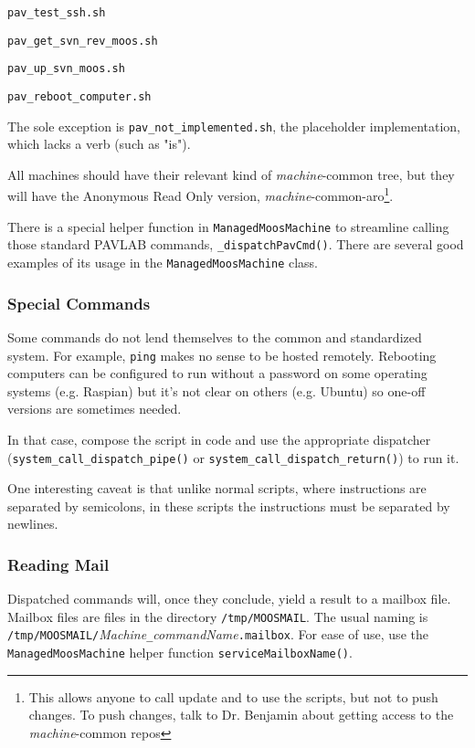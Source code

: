 \documentclass[11pt]{article}
\begin{document}
\begin{description}
\item \texttt{pav\_test\_ssh.sh}
\item \texttt{pav\_get\_svn\_rev\_moos.sh}
\item \texttt{pav\_up\_svn\_moos.sh}
\item \texttt{pav\_reboot\_computer.sh}
\end{description}

The sole exception is \texttt{pav\_not\_implemented.sh}, the placeholder implementation, which lacks a verb (such as "is").

All machines should have their relevant kind of \textit{machine}-common tree, but they will have the Anonymous Read Only version, \textit{machine}-common-aro\footnote{This allows anyone to call update and to use the scripts, but not to push changes. To push changes, talk to Dr. Benjamin about getting access to the \textit{machine}-common repos}.

There is a special helper function in \texttt{ManagedMoosMachine} to streamline calling those standard PAVLAB commands, \texttt{\_dispatchPavCmd()}. There are several good examples of its usage in the \texttt{ManagedMoosMachine} class.

\subsubsection{Special Commands}

Some commands do not lend themselves to the common and standardized system. For example, \texttt{ping} makes no sense to be hosted remotely. Rebooting computers can be configured to run without a password on some operating systems (e.g. Raspian) but it's not clear on others (e.g. Ubuntu) so one-off versions are sometimes needed.

In that case, compose the script in code and use the appropriate dispatcher (\texttt{system\_call\_dispatch\_pipe()} or \texttt{system\_call\_dispatch\_return()}) to run it. 

One interesting caveat is that unlike normal scripts, where instructions are separated by semicolons, in these scripts the instructions must be separated by newlines.

\subsubsection{Reading Mail}

Dispatched commands will, once they conclude, yield a result to a mailbox file. Mailbox files are files in the directory \texttt{/tmp/MOOSMAIL}. The usual naming is \texttt{/tmp/MOOSMAIL/}\textit{Machine}\texttt{\_}\textit{commandName}\texttt{.mailbox}. For ease of use, use the \texttt{ManagedMoosMachine} helper function \texttt{serviceMailboxName()}.
\end{document}
